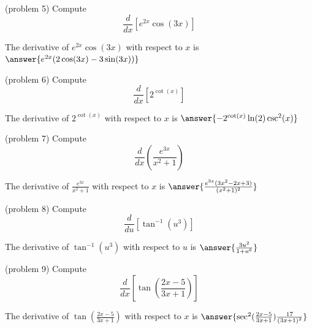 \documentclass{ximera}
\begin{document}
\begin{problem}(problem 5)
  Compute
  \[
  \frac{d}{dx} \left[e^{2x} \cos(3x)\right]
  \]
  
   
    
		The derivative of $e^{2x} \cos(3x)$ with respect to $x$ is
		 $\answer{e^{2x}(2\cos(3x)-3\sin(3x))}$
		
\end{problem}



\begin{problem}(problem 6)
  Compute
  \[
  \frac{d}{dx} \left[2^{\cot(x)}\right]
  \]
  
    
    
		The derivative of $2^{\cot(x)}$ with respect to $x$ is
		 $\answer{-2^{\cot(x)}\ln(2)\csc^2(x)}$
		
\end{problem}

\begin{foldable}
\end{foldable}

\begin{problem}(problem 7)
  Compute
  \[
  \frac{d}{dx} \left(\frac{e^{3x}}{x^2 + 1}\right)
  \]
  
    
		The derivative of $\frac{e^{3x}}{x^2 + 1}$ with respect to $x$ is
		 $\answer{\frac{e^{3x}(3x^2 -2x +3)}{(x^2 + 1)^2}}$
		
\end{problem}



\begin{problem}(problem 8)
  Compute
  \[
  \frac{d}{du} \left[\tan^{-1}(u^3)\right]
  \]
  
    
		The derivative of $\tan^{-1}(u^3)$ with respect to $u$ is
		 $\answer{\frac{3u^2}{1+u^6}}$
		
\end{problem}




\begin{problem}(problem 9)
  Compute
  \[
  \frac{d}{dx} \left[\tan\left(\frac{2x-5}{3x+1}\right)\right]
  \]
  
   
		The derivative of $\tan\left(\frac{2x-5}{3x+1}\right)$ with respect to $x$ is
		 $\answer{\sec^2(\frac{2x-5}{3x+1})\frac{17}{(3x+1)^2}}$
		
\end{problem}
\end{document}
